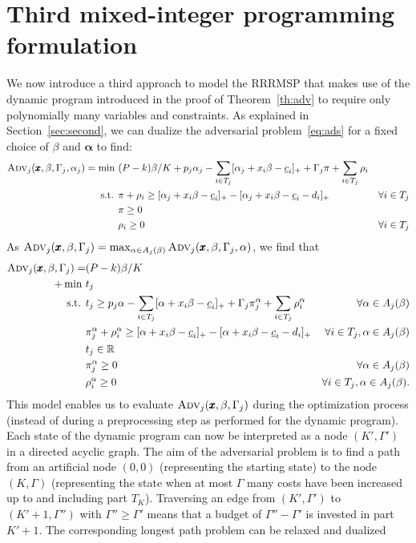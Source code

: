\section{Third mixed-integer programming formulation}
\label{sec:compact}

We now introduce a third approach to model the RRRMSP that makes use of the dynamic program introduced in the proof of Theorem~\ref{th:adv} to require only polynomially many variables and constraints.
As explained in Section~\ref{sec:second}, we can dualize the adversarial problem~\eqref{eq:ads} for a fixed choice of $\beta$ and $\pmb{\alpha}$ to find:
\begin{align*}
\textsc{Adv}_j(\pmb{x},\beta,\Gamma_j,\alpha_j) = \min\ &(P-k)\beta\lasse{/K} + p_j\alpha_j - \sum_{i\in T_j} [\alpha_j + x_i\beta - \underline{c}_i]_+ + \Gamma_j \pi + \sum_{i\in T_j} \rho_i \\
\text{s.t. } & \pi + \rho_i \ge [\alpha_j + x_i\beta - \underline{c}_i]_+ - [\alpha_j + x_i \beta - \underline{c}_i - d_i]_+ & \forall i\in T_j \\
& \pi \ge 0 \\
& \rho_i \ge 0 & \forall i\in T_j
\end{align*}
As $\textsc{Adv}_j(\pmb{x},\beta,\Gamma_j) = \max_{\alpha\in A_j(\beta)} \textsc{Adv}_j(\pmb{x},\beta,\Gamma_j,\alpha)$, we find that
\begin{align*}
\textsc{Adv}_j(\pmb{x},\beta,\Gamma_j) = &(P-k)\beta{/K} \\
+ \min\ & t_j \\
\text{s.t. } & t_j \ge p_j \alpha - \sum_{i\in T_j} [\alpha + x_i\beta - \underline{c}_i]_+ + \Gamma_j \pi_j^\alpha + \sum_{i\in T_j} \rho_i^\alpha & \forall \alpha \in A_j(\beta) \\
& \pi_j^\alpha + \rho_i^\alpha \ge [\alpha + x_i\beta - \underline{c}_i]_+ - [\alpha + x_i \beta - \underline{c}_i - d_i]_+ & \forall i\in T_j, \alpha\in A_j(\beta)\\
& t_j \in \mathbb{R} \\
& \pi_j^\alpha \ge 0 & \forall \alpha\in A_j(\beta) \\
& \rho_i^\alpha \ge 0 & \forall i\in T_j , \alpha\in A_j(\beta).
\end{align*}
This model enables us to evaluate $\textsc{Adv}_j(\pmb{x},\beta,\Gamma_j)$ during the optimization process (instead of during a preprocessing step as performed for the dynamic program). Each state of the dynamic program can now be interpreted as a node $(K',\Gamma')$ in a directed acyclic graph. The aim of the adversarial problem is to find a path from an artificial node $(0,0)$ (representing the starting state) to the node $(K,\Gamma)$ (representing the state when at most $\Gamma$ many costs have been increased up to and including part $T_K$). Traversing an edge from $(K',\Gamma')$ to $(K'+1,\Gamma'')$ with $\Gamma''\ge \Gamma'$ means that a budget of $\Gamma''-\Gamma'$ is invested in part $K'+1$. The corresponding longest path problem can be relaxed and dualized 
